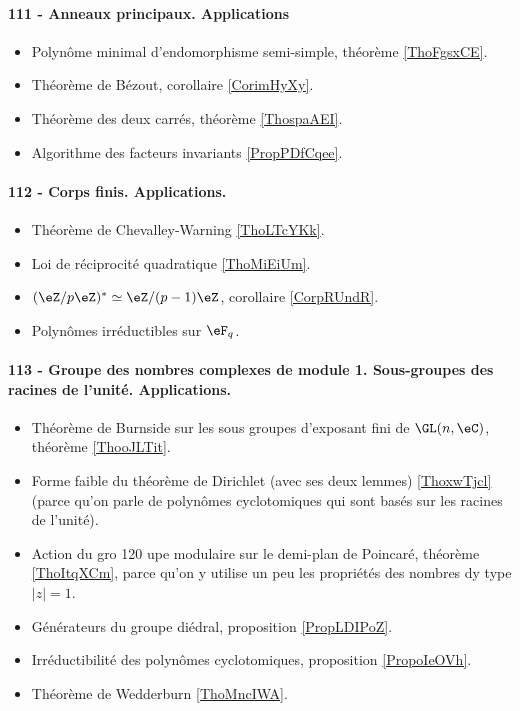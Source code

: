 \paragraph{111 - Anneaux principaux. Applications}
\begin{itemize}
    \item Polynôme minimal d'endomorphisme semi-simple, théorème \ref{ThoFgsxCE}.
    \item Théorème de Bézout, corollaire \ref{CorimHyXy}.
    \item Théorème des deux carrés, théorème \ref{ThospaAEI}.
    \item Algorithme des facteurs invariants \ref{PropPDfCqee}.
\end{itemize}

\paragraph{112 - Corps finis. Applications.}
\begin{itemize}
    \item Théorème de Chevalley-Warning \ref{ThoLTcYKk}.
    \item Loi de réciprocité quadratique \ref{ThoMiEiUm}.
    \item \( (\eZ/p\eZ)^*\simeq \eZ/(p-1)\eZ\), corollaire \ref{CorpRUndR}.
    \item Polynômes irréductibles sur \( \eF_q\).
\end{itemize}

\paragraph{113 - Groupe des nombres complexes de module 1. Sous-groupes des racines de l’unité. Applications.}
\begin{itemize}
    \item Théorème de Burnside sur les sous groupes d'exposant fini de \( \GL(n,\eC)\), théorème \ref{ThooJLTit}.
    \item Forme faible du théorème de Dirichlet (avec ses deux lemmes) \ref{ThoxwTjcl} (parce qu'on parle de polynômes cyclotomiques qui sont basés sur les racines de l'unité).
    \item Action du gro  120  upe modulaire sur le demi-plan de Poincaré, théorème \ref{ThoItqXCm}, parce qu'on y utilise un peu les propriétés des nombres dy type \( | z |=1\).
    \item Générateurs du groupe diédral, proposition \ref{PropLDIPoZ}.
    \item Irréductibilité des polynômes cyclotomiques, proposition \ref{PropoIeOVh}.
    \item Théorème de Wedderburn \ref{ThoMncIWA}.
\end{itemize}


